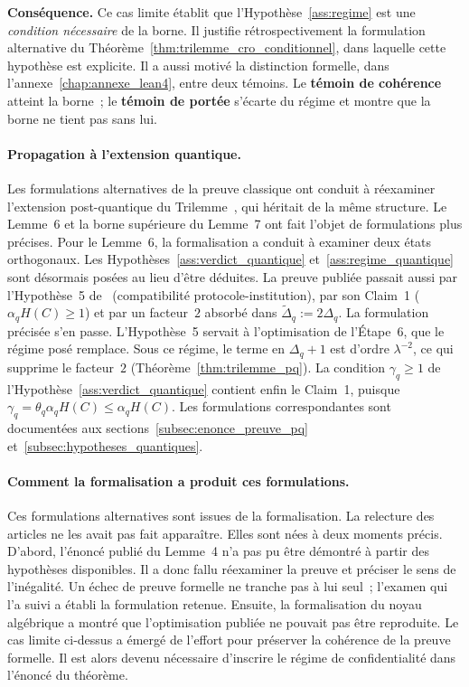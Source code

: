 \begin{sloppypar}
\textbf{Cons\'equence.} Ce cas limite \'etablit que
l'Hypoth\`ese~\ref{ass:regime} est une \emph{condition n\'ecessaire} de la
borne. Il justifie r\'etrospectivement la formulation alternative du
Th\'eor\`eme~\ref{thm:trilemme_cro_conditionnel}, dans laquelle cette
hypoth\`ese est explicite. Il a aussi motiv\'e la distinction formelle, dans
l'annexe~\ref{chap:annexe_lean4}, entre deux t\'emoins. Le \textbf{t\'emoin de coh\'erence}
atteint la borne~; le \textbf{t\'emoin de port\'ee} s'\'ecarte du
r\'egime et montre que la borne ne tient pas sans lui.

\paragraph{Propagation \`a l'extension quantique.}
Les formulations alternatives de la preuve classique ont conduit \`a
r\'eexaminer l'extension post-quantique du Trilemme~\cite{MINKA2026PQCRO},
qui h\'eritait de la m\^eme structure. Le Lemme~6 et la borne sup\'erieure
du Lemme~7 ont fait l'objet de formulations plus pr\'ecises. Pour le
Lemme~6, la formalisation a conduit \`a examiner deux
\'etats orthogonaux. Les Hypoth\`eses~\ref{ass:verdict_quantique} et~\ref{ass:regime_quantique} sont d\'esormais pos\'ees
au lieu d'\^etre d\'eduites. La preuve publi\'ee passait aussi par l'Hypoth\`ese~5
de~\cite{MINKA2026PQCRO} (compatibilit\'e protocole-institution), par son Claim~1
($\alpha_q H(C) \geq 1$) et par un facteur~$2$ absorb\'e dans $\tilde\Delta_q := 2\Delta_q$. La
formulation pr\'ecis\'ee s'en passe. L'Hypoth\`ese~5 servait \`a l'optimisation de l'\'Etape~6, que
le r\'egime pos\'e remplace. Sous ce r\'egime, le terme en $\Delta_q + 1$ est d'ordre $\lambda^{-2}$,
ce qui supprime le facteur~$2$ (Th\'eor\`eme~\ref{thm:trilemme_pq}). La condition
$\gamma_q \geq 1$ de l'Hypoth\`ese~\ref{ass:verdict_quantique} contient enfin le Claim~1, puisque
$\gamma_q = \theta_q\alpha_q H(C) \leq \alpha_q H(C)$. Les formulations correspondantes
sont document\'ees aux
sections~\ref{subsec:enonce_preuve_pq} et~\ref{subsec:hypotheses_quantiques}.

\paragraph{Comment la formalisation a produit ces formulations.}
Ces formulations alternatives sont issues de la formalisation. La relecture
des articles ne les avait pas fait appara\^itre. Elles sont n\'ees \`a deux
moments pr\'ecis. D'abord, l'\'enonc\'e publi\'e du Lemme~4 n'a pas pu \^etre
d\'emontr\'e \`a partir des hypoth\`eses disponibles. Il a donc fallu
r\'eexaminer la preuve et pr\'eciser le sens de l'in\'egalit\'e. Un \'echec
de preuve formelle ne tranche pas \`a lui seul~; l'examen qui l'a suivi a
\'etabli la formulation retenue. Ensuite, la formalisation du noyau
alg\'ebrique a montr\'e que l'optimisation publi\'ee ne pouvait pas \^etre
reproduite. Le cas limite ci-dessus a \'emerg\'e de l'effort pour pr\'eserver
la coh\'erence de la preuve formelle. Il est alors devenu n\'ecessaire
d'inscrire le r\'egime de confidentialit\'e dans l'\'enonc\'e du
th\'eor\`eme.


\end{sloppypar}
